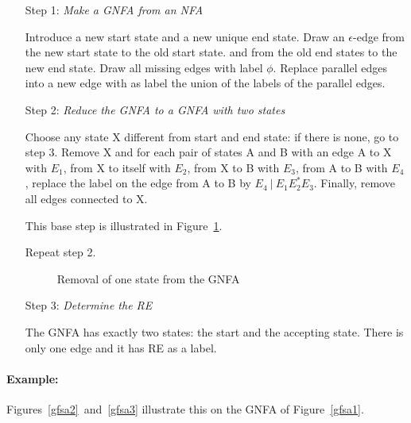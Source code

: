 \begin{itemize}
\item[Step 1:]  {\em Make a GNFA from an NFA}

Introduce a new start state and a new unique end state. Draw an
$\epsilon$-edge from the new start state to the old start state. and
from the old end states to the new end state. Draw all missing edges
with label $\phi$. Replace parallel edges into a new edge with as
label the union of the labels of the parallel edges.

\item[Step 2:]  {\em Reduce the GNFA to a GNFA with two states}

Choose any state X different from start and end state: if there is
none, go to step 3. Remove X and for each pair of states A and B with
an edge
A to X with $E_1$,
%
from X to itself with $E_2$,
%
from X to B with $E_3$,
%
from A to B with $E_4$,
%
replace the label on the edge from A to B by
$E_4~|~E_1E_2^*E_3$. Finally, remove all edges connected to X.

This base step is illustrated in Figure~\ref{redgfsa1}.

Repeat step 2.

\begin{figure}[h]
\caption{Removal of one state from the GNFA \label{redgfsa1}}
\end{figure}


\item[Step 3:]  {\em Determine the RE}

The GNFA has exactly two states: the start and the accepting
state. There is only one edge and it has RE as a label.
\end{itemize}


\paragraph{Example:} Figures~\ref{gfsa2}~and~\ref{gfsa3} illustrate
this on the GNFA of Figure~\ref{gfsa1}.


